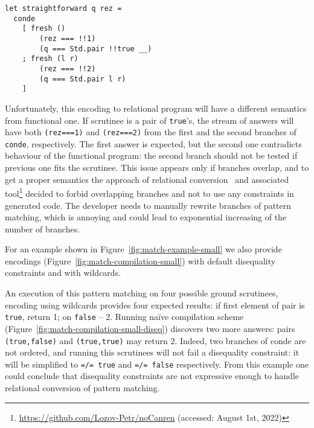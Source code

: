 \begin{lstlisting}
let straightforward q rez =
  conde
    [ fresh () 
        (rez === !!1)
        (q === Std.pair !!true __) 
    ; fresh (l r)  
        (rez === !!2)
        (q === Std.pair l r)
    ]
\end{lstlisting}

\noindent Unfortunately, this encoding to relational program will have a different semantics from functional one. If scrutinee is a pair of \lstinline|true|'s, the stream of answers will have both \lstinline|(rez===1)| and \lstinline|(rez===2)| from the first and the second branches of \lstinline|conde|, respectively. The first answer is expected, but the second one contradicts behaviour of the functional program: the second branch should not be tested if previous one fits the scrutinee.
This issue appears only if branches overlap, and to get a proper semantics the approach of relational conversion~\cite{RelConversion} and associated tool\footnote{\url{https://github.com/Lozov-Petr/noCanren} (accessed: August 1st, 2022)} decided to forbid overlapping branches and not to use any constraints in generated code. 
The developer needs to manually rewrite branches of pattern matching, which is annoying and could lead to exponential increasing of the number of branches.

For an example shown in Figure~\ref{fig:match-example-small} we also provide encodings (Figure~\ref{fig:match-compilation-small}) with default disequality constraints and with wildcards.

An execution of this pattern matching on four possible ground scrutinees, encoding using wildcards provides four expected results: if first element of pair is \lstinline{true}, return 1; on \lstinline{false} -- 2.
Running na\"ive compilation scheme (Figure~\ref{fig:match-compilation-small-diseq}) discovers two more answers: pairs \lstinline|(true,false)| and \lstinline|(true,true)| may return 2.
Indeed, two branches of conde are not ordered, and running this scrutinees will not fail a disequality constraint: it will be simplified to \lstinline|=/= true| and \lstinline|=/= false| respectively.
From this example one could conclude that disequality constraints are not expressive enough to handle relational conversion of pattern matching.

